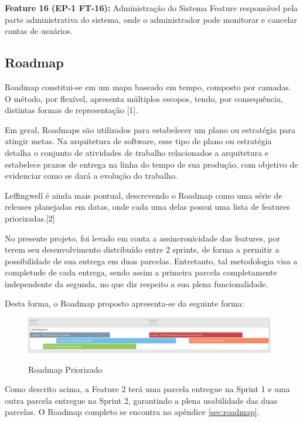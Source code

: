 \textbf{Feature 16 (EP-1 FT-16):} Administração do Sistema
Feature responsável pela parte administrativa do sistema, onde o administrador pode monitorar e cancelar contas de usuários.

\subsection{Roadmap}

Roadmap constitui-se em um mapa baseado em tempo, composto por camadas. O método, por flexível, apresenta múltiplos escopos, tendo, por consequência, distintas formas de representação [1].

Em geral, Roadmaps são utilizados para estabelecer um plano ou estratégia para atingir metas. Na arquitetura de software, esse tipo de plano ou estratégia detalha o conjunto de atividades de trabalho relacionados a arquitetura e estabelece prazos de entrega na linha do tempo de sua produção, com objetivo de evidenciar como se dará a evolução do trabalho.

Leffingwell é ainda mais pontual, descrevendo o Roadmap como uma série de releases planejadas em datas, onde cada uma delas possui uma lista de features priorizadas.[2]

No presente projeto, foi levado em conta a assincronicidade das features, por terem seu desenvolvimento distribuído entre 2 sprints, de forma a permitir a possibilidade de sua entrega em duas parcelas. Entretanto, tal metodologia visa a completude de cada entrega, sendo assim a primeira parcela completamente independente da segunda, no que diz respeito a sua plena funcionalidade.

Desta forma, o Roadmap proposto apresenta-se da seguinte forma:

\FloatBarrier
\begin{figure}[!htpd]
		\centering
		\includegraphics[scale=0.3]{figuras/roadmapPRI}
		\label{img:roadmapPRI}
		\caption{Roadmap Priorizado}
\end{figure}
\FloatBarrier

Como descrito acima, a Feature 2 terá uma parcela entregue na Sprint 1 e uma outra parcela entregue na Sprint 2, garantindo a plena usabilidade das duas parcelas.
O Roadmap completo se encontra no apêndice \ref{sec:roadmap}.

